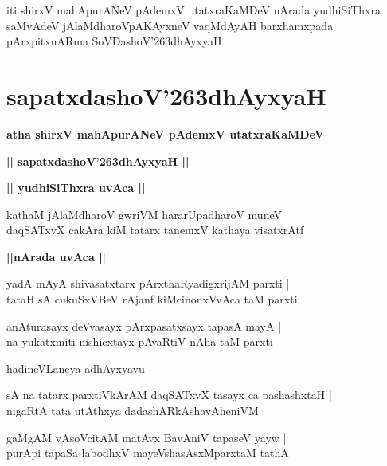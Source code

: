 \documentclass[twoside,12pt,openright]{book}
\def\S{\char'263}
\newcounter{shloka}[chapter]
\def\uvaca#1{\centerline{{\large\textbf{#1}}}}
\begin{document}
\begin{center}
iti shirxV mahApurANeV pAdemxV utatxraKaMDeV  nArada yudhiSiThxra saMvAdeV jAlaMdharoVpAKAyxneV 
vaqMdAyAH barxhamxpada pArxpitxnARma SoVDashoV\S dhAyxyaH 
\end{center}

\chapter{sapatxdashoV\S dhAyxyaH}

\begin{center}
{\LARGE\bfseries atha shirxV mahApurANeV pAdemxV utatxraKaMDeV} 
\end{center}

\begin{center}
{\LARGE\bfseries  || sapatxdashoV\S dhAyxyaH ||}
\end{center}

\uvaca{|| yudhiSiThxra uvAca ||}

\begin{shloka}%
kathaM jAlaMdharoV gwriVM hararUpadharoV muneV |\\
daqSATxvX cakAra kiM tatarx tanemxV kathaya visatxrAtf 
\end{shloka}

\uvaca{||nArada uvAca ||}

\begin{shloka}%
yadA mAyA shivasatxtarx pArxthaRyadigxrijAM parxti |\\
tataH sA cukuSxVBeV rAjanf kiMcinonxVvAca taM parxti 
\end{shloka}

\begin{shloka}%
anAturasayx deVvasayx pArxpasatxsayx tapasA mayA |\\
na yukatxmiti nishicxtayx pAvaRtiV nAha taM parxti 
\end{shloka}

\begin{center}
hadineVLaneya adhAyxyavu
\end{center}

\begin{shloka}%
sA na tatarx parxtiVkArAM daqSATxvX tasayx ca pashashxtaH |\\
nigaRtA tata utAthxya dadashARkAshavAheniVM 
\end{shloka}

\begin{shloka}%
gaMgAM vAsoVcitAM matAvx BavAniV tapaseV yayw |\\
purApi tapaSa labodhxV mayeVshasAsxMparxtaM tathA 
\end{shloka}
\end{document}
